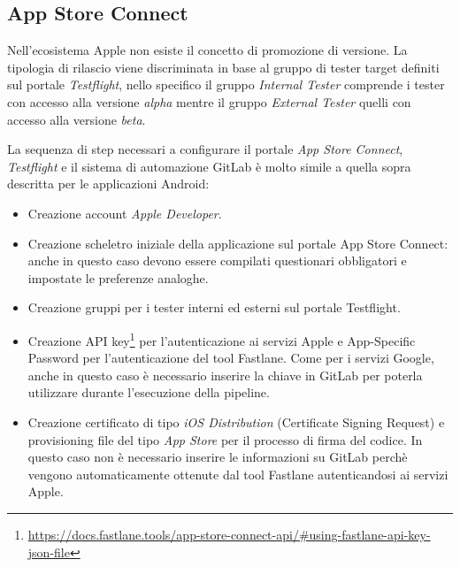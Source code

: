 \subsection{App Store Connect}
Nell'ecosistema Apple non esiste il concetto di promozione di versione. La tipologia di rilascio viene discriminata in base al gruppo di tester target definiti sul portale \textit{Testflight}, nello specifico il gruppo \textit{Internal Tester} comprende i tester con accesso alla versione \textit{alpha} mentre il gruppo \textit{External Tester} quelli con accesso alla versione \textit{beta}.

La sequenza di step necessari a configurare il portale \textit{App Store Connect}, \textit{Testflight} e il sistema di automazione GitLab è molto simile a quella sopra descritta per le applicazioni Android:

\begin{itemize}
    \item Creazione account \textit{Apple Developer}.
    \item Creazione scheletro iniziale della applicazione sul portale App Store Connect: anche in questo caso devono essere compilati questionari obbligatori e impostate le preferenze analoghe.
    \item Creazione gruppi per i tester interni ed esterni sul portale Testflight.
    \item Creazione API key\footnote{\href{https://docs.fastlane.tools/app-store-connect-api/\#using-fastlane-api-key-json-file}{https://docs.fastlane.tools/app-store-connect-api/\#using-fastlane-api-key-json-file}} per l'autenticazione ai servizi Apple e App-Specific Password per l'autenticazione del tool Fastlane. Come per i servizi Google, anche in questo caso è necessario inserire la chiave in GitLab per poterla utilizzare durante l'esecuzione della pipeline.
    \item Creazione certificato di tipo \textit{iOS Distribution} (Certificate Signing Request) e provisioning file del tipo \textit{App Store} per il processo di firma del codice. In questo caso non è necessario inserire le informazioni su GitLab perchè vengono automaticamente ottenute dal tool Fastlane autenticandosi ai servizi Apple.
\end{itemize}


